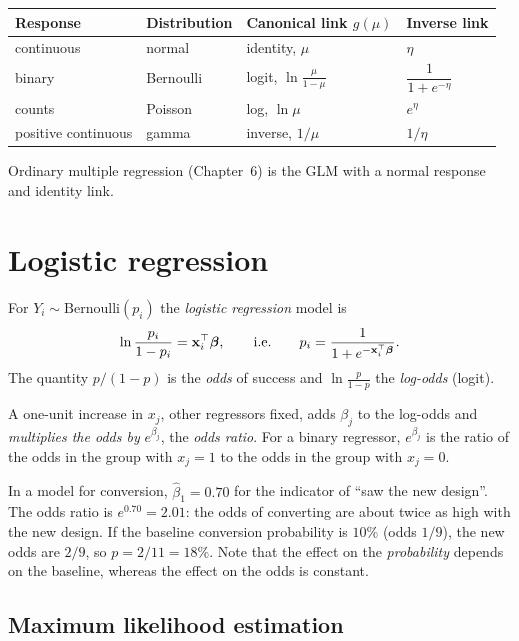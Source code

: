 \begin{center}
\begin{tabular}{llll}
\toprule
Response & Distribution & Canonical link $g(\mu)$ & Inverse link\\
\midrule
continuous & normal & identity, $\mu$ & $\eta$\\
binary & Bernoulli & logit, $\ln\frac\mu{1-\mu}$ & $\dfrac1{1+e^{-\eta}}$\\
counts & Poisson & log, $\ln\mu$ & $e^\eta$\\
positive continuous & gamma & inverse, $1/\mu$ & $1/\eta$\\
\bottomrule
\end{tabular}
\end{center}

Ordinary multiple regression (Chapter~6) is the GLM with a normal response and identity link.

\section{Logistic regression}

For $Y_i\sim\mathrm{Bernoulli}(p_i)$ the \emph{logistic regression} model is
\[ \ln\frac{p_i}{1-p_i}=\mathbf{x}_i^{\top}\boldsymbol\beta,\qquad\text{i.e.}\qquad p_i=\frac1{1+e^{-\mathbf{x}_i^{\top}\boldsymbol\beta}}. \]
The quantity $p/(1-p)$ is the \emph{odds} of success and $\ln\frac p{1-p}$ the \emph{log-odds} (logit).

\begin{theorem}\label{thm:logit-interp}
A one-unit increase in $x_j$, other regressors fixed, adds $\beta_j$ to the log-odds and \emph{multiplies the odds by} $e^{\beta_j}$, the \emph{odds ratio}. For a binary regressor, $e^{\beta_j}$ is the ratio of the odds in the group with $x_j=1$ to the odds in the group with $x_j=0$.
\end{theorem}

\begin{example}
In a model for conversion, $\hat\beta_1=0.70$ for the indicator of ``saw the new design''. The odds ratio is $e^{0.70}=2.01$: the odds of converting are about twice as high with the new design. If the baseline conversion probability is $10\%$ (odds $1/9$), the new odds are $2/9$, so $p=2/11=18\%$. Note that the effect on the \emph{probability} depends on the baseline, whereas the effect on the odds is constant.
\end{example}

\subsection{Maximum likelihood estimation}

